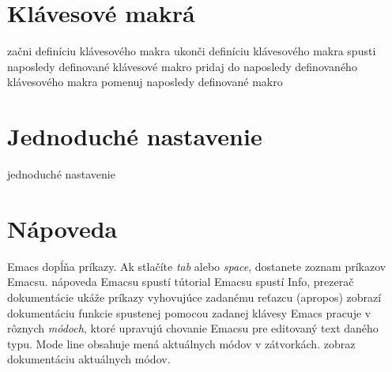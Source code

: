 \section{Klávesové makrá}

 začni definíciu klávesového makra
 ukonči definíciu klávesového makra
 spusti naposledy definované klávesové makro
 pridaj do naposledy definovaného klávesového makra
 pomenuj naposledy definované makro

\section{Jednoduché nastavenie}

 jednoduché nastavenie

\section{Nápoveda}

Emacs dopĺňa príkazy. Ak stlačíte  {\it tab\/} alebo {\it
space\/}, dostanete zoznam príkazov Emacsu.
\askip
{} nápoveda Emacsu
 spustí tútorial Emacsu
 spustí Info, prezerač dokumentácie
 ukáže príkazy vyhovujúce zadanému reťazcu (apropos)
 zobrazí dokumentáciu funkcie spustenej pomocou zadanej klávesy
\askip
Emacs pracuje v rôznych {\it módoch}, ktoré upravujú chovanie
Emacsu pre editovaný text daného typu. Mode line obsahuje mená aktuálnych
módov v zátvorkách.
\askip
{} zobraz dokumentáciu aktuálnych módov.

\copyrightnotice

\bye

